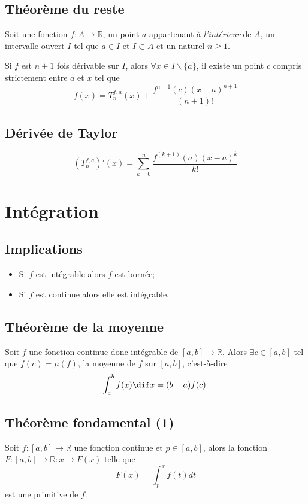 \subsection{Théorème du reste}
Soit une fonction $f : A \rightarrow \mathbb{R}$,
un point $a$ appartenant à \emph{l'intérieur} de $A$,
un intervalle ouvert $I$ tel que $a \in I$ et $I\subset A$
et un naturel $n \geq 1$.

Si $f$ est $n + 1$ fois dérivable sur $I$,
alors $\forall x \in I \backslash \{a\}$,
il existe un point $c$ compris strictement entre $a$ et $x$ tel que
\[ f(x) = T_n^{f,a}(x) + \frac{f^{n+1}(c)(x - a)^{n+1}}{(n + 1)!} \]

\subsection{Dérivée de Taylor}
\[ \left(T_n^{f,a}\right)'(x) =
\sum_{k = 0}^n \frac{f^{(k+1)}(a)(x - a)^{k}}{k!} \]

\section{Intégration}
\subsection{Implications}
\begin{itemize}
  \item Si $f$ est intégrable alors $f$ est bornée;
  \item Si $f$ est continue alors elle est intégrable.
\end{itemize}

\subsection{Théorème de la moyenne}
Soit $f$ une fonction continue donc intégrable de $[a,b] \rightarrow \mathbb{R}$.
Alors $\exists c \in [a,b]$ tel que $f(c) = \mu{(f)}$,
la moyenne de $f$ sur $[a,b]$,
c'est-à-dire
\[ \int_a^b f(x) \dif x = (b - a)f(c). \]

\subsection{Théorème fondamental (1)}
Soit $f:[a,b] \to \mathbb{R}$ une fonction continue et $p \in [a,b]$,
alors la fonction $F : [a,b] \to \mathbb{R} : x \mapsto F(x)$
telle que
\[ F(x) = \int_p^x f(t) dt \]
est une primitive de $f$.

